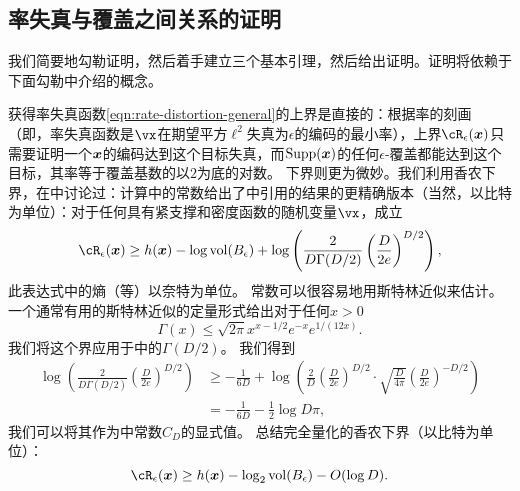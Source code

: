 \documentclass[../../book-main.tex]{subfiles}
\begin{document}
\subsection{率失真与覆盖之间关系的证明}

我们简要地勾勒证明，然后着手建立三个基本引理，然后给出证明。证明将依赖于下面勾勒中介绍的概念。

获得率失真函数\eqref{eqn:rate-distortion-general}的上界是直接的：根据率的刻画（即，率失真函数是$\vx$在期望平方$\ell^2$失真为$\epsilon$的编码的最小率），上界$\cR_{\epsilon}(\x)$只需要证明一个$\bm{x}$的编码达到这个目标失真，而$\operatorname{Supp}(\bm{x})$的任何$\epsilon$-覆盖都能达到这个目标，其率等于覆盖基数的以$2$为底的对数。
下界则更为微妙。我们利用香农下界，在中讨论过：计算\cite[\S III, (22)]{Linder1994-ej}中的常数给出了中引用的结果的更精确版本（当然，以比特为单位）：对于任何具有紧支撑和密度函数的随机变量$\vx$，成立
\begin{equation}\label{eq:slb-appendix-1}
    \cR_{\epsilon}(\x)
    \geq
    h(\x)
    - \log \volume(B_{\epsilon})
    +
    \log
    \left(
    \frac{
    	2
    }
    {
    	D \Gamma(D/2)
    }
    \left(
    \frac{
    	D
    }
    {
    	2e
    }
    \right)^{D/2}
    \right),
\end{equation}
此表达式中的熵（等）以奈特为单位。
常数可以很容易地用斯特林近似来估计。
一个通常有用的斯特林近似的定量形式给出对于任何$x > 0$ \cite{Jameson2015-hy}
\begin{equation}
    \Gamma(x) \leq \sqrt{2\pi} x^{x - 1/2} e^{-x} e^{1/(12x)}.
\end{equation}
我们将这个界应用于中的$\Gamma(D/2)$。
我们得到
\begin{align}
    \log
    \left(
    \frac{
        2
    }
    {
        D \Gamma(D/2)
    }
    \left(
    \frac{
        D
    }
    {
        2e
    }
    \right)^{D/2}
    \right)
    &\geq
    -\frac{1}{6D}
    +
    \log\left(
        \frac{2}{D} 
        \left(
        \frac{
            D
        }
        {
            2e
        }
        \right)^{D/2}
        \cdot
        \sqrt{\frac{D}{4\pi}}
        \left(
        \frac{D}{2e}
        \right)^{-D/2}
    \right)
    \\
    &=
    -\frac{1}{6D}
    - \frac{1}{2}\log D\pi,\label{eq:slb-constant-est}
\end{align}
我们可以将其作为中常数$C_D$的显式值。
总结完全量化的香农下界（以比特为单位）：
\begin{equation}\label{eq:slb-appendix}
    \cR_{\epsilon}(\x)
    \geq
    h(\x)
    - \log_2 \volume(B_{\epsilon})
    - O(\log D).
\end{equation}
\end{document}
